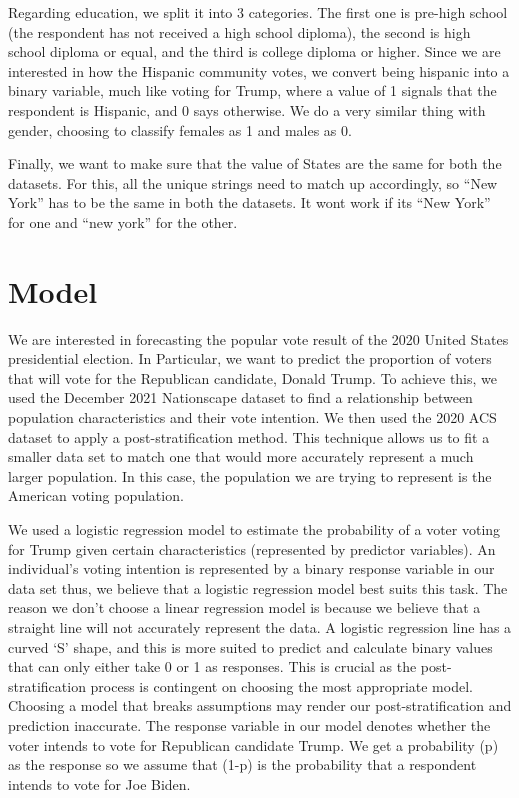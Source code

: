 \documentclass[
]{article}
\begin{document}
Regarding education, we split it into 3 categories. The first one is pre-high school (the respondent has not received a high school diploma), the second is high school diploma or equal, and the third is college diploma or higher. Since we are interested in how the Hispanic community votes, we convert being hispanic into a binary variable, much like voting for Trump, where a value of 1 signals that the respondent is Hispanic, and 0 says otherwise. We do a very similar thing with gender, choosing to classify females as 1 and males as 0.

Finally, we want to make sure that the value of States are the same for both the datasets. For this, all the unique strings need to match up accordingly, so ``New York'' has to be the same in both the datasets. It wont work if its ``New York'' for one and ``new york'' for the other.

\hypertarget{model}{%
\section{Model}\label{model}}

We are interested in forecasting the popular vote result of the 2020 United States presidential election. In Particular, we want to predict the proportion of voters that will vote for the Republican candidate, Donald Trump. To achieve this, we used the December 2021 Nationscape dataset to find a relationship between population characteristics and their vote intention. We then used the 2020 ACS dataset to apply a post-stratification method. This technique allows us to fit a smaller data set to match one that would more accurately represent a much larger population. In this case, the population we are trying to represent is the American voting population.

We used a logistic regression model to estimate the probability of a voter voting for Trump given certain characteristics (represented by predictor variables). An individual's voting intention is represented by a binary response variable in our data set thus, we believe that a logistic regression model best suits this task. The reason we don't choose a linear regression model is because we believe that a straight line will not accurately represent the data. A logistic regression line has a curved `S' shape, and this is more suited to predict and calculate binary values that can only either take 0 or 1 as responses. This is crucial as the post-stratification process is contingent on choosing the most appropriate model. Choosing a model that breaks assumptions may render our post-stratification and prediction inaccurate. The response variable in our model denotes whether the voter intends to vote for Republican candidate Trump. We get a probability (p) as the response so we assume that (1-p) is the probability that a respondent intends to vote for Joe Biden.
\end{document}
